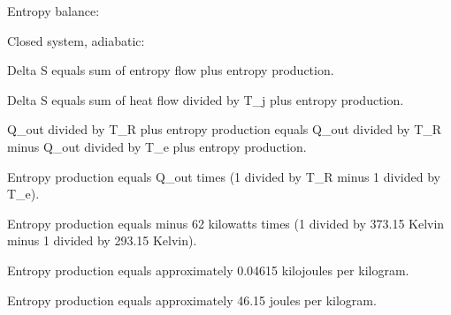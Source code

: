 Entropy balance:  

Closed system, adiabatic:  

Delta S equals sum of entropy flow plus entropy production.  

Delta S equals sum of heat flow divided by T_j plus entropy production.  

Q_out divided by T_R plus entropy production equals Q_out divided by T_R minus Q_out divided by T_e plus entropy production.  

Entropy production equals Q_out times (1 divided by T_R minus 1 divided by T_e).  

Entropy production equals minus 62 kilowatts times (1 divided by 373.15 Kelvin minus 1 divided by 293.15 Kelvin).  

Entropy production equals approximately 0.04615 kilojoules per kilogram.  

Entropy production equals approximately 46.15 joules per kilogram.